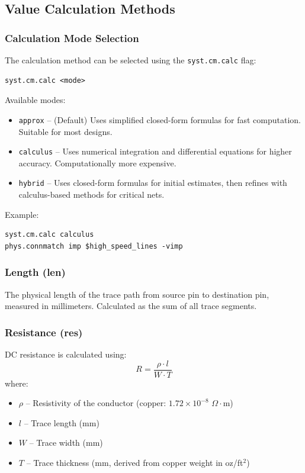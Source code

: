 \subsection{Value Calculation Methods}

\subsubsection{Calculation Mode Selection}
The calculation method can be selected using the \texttt{syst.cm.calc} flag:
\begin{verbatim}
syst.cm.calc <mode>
\end{verbatim}

Available modes:
\begin{itemize}
\item \texttt{approx} -- (Default) Uses simplified closed-form formulas for fast computation. Suitable for most designs.
\item \texttt{calculus} -- Uses numerical integration and differential equations for higher accuracy. Computationally more expensive.
\item \texttt{hybrid} -- Uses closed-form formulas for initial estimates, then refines with calculus-based methods for critical nets.
\end{itemize}

Example:
\begin{verbatim}
syst.cm.calc calculus
phys.connmatch imp $high_speed_lines -vimp
\end{verbatim}

\subsubsection{Length (len)}
The physical length of the trace path from source pin to destination pin, measured in millimeters. Calculated as the sum of all trace segments.

\subsubsection{Resistance (res)}
DC resistance is calculated using:
\begin{equation}
R = \frac{\rho \cdot l}{W \cdot T}
\end{equation}
where:
\begin{itemize}
\item $\rho$ -- Resistivity of the conductor (copper: $1.72 \times 10^{-8}$ $\Omega\cdot$m)
\item $l$ -- Trace length (mm)
\item $W$ -- Trace width (mm)
\item $T$ -- Trace thickness (mm, derived from copper weight in oz/ft$^2$)
\end{itemize}

